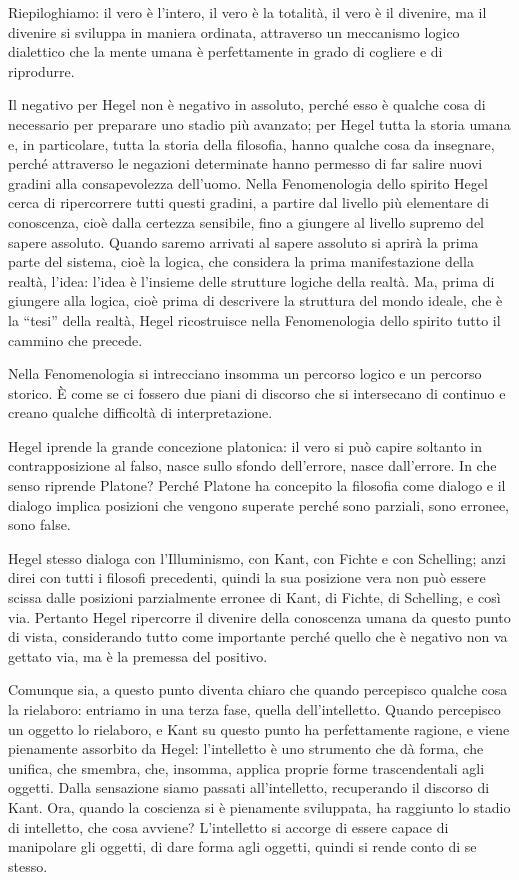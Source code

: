 \documentclass[a4paper,12pt,oneside,openany]{book}%
\begin{document}
Riepiloghiamo: il vero è l’intero, il vero è la totalità, il vero è il divenire, ma il divenire si sviluppa in maniera ordinata, attraverso un meccanismo logico dialettico che la mente umana è perfettamente in grado di cogliere e di riprodurre. 	
	
Il negativo per Hegel non è negativo in assoluto, perché esso è qualche cosa di necessario per preparare uno stadio più avanzato; per Hegel tutta la storia umana e, in particolare, tutta la storia della filosofia, hanno qualche cosa da insegnare, perché attraverso le negazioni determinate hanno permesso di far salire nuovi gradini alla consapevolezza dell’uomo. Nella Fenomenologia dello spirito Hegel cerca di ripercorrere tutti questi gradini, a partire dal livello più elementare di conoscenza, cioè dalla certezza sensibile, fino a giungere al livello supremo del sapere assoluto. Quando saremo arrivati al sapere assoluto si aprirà la prima parte del sistema, cioè la logica, che considera la prima manifestazione della realtà, l’idea: l’idea è l’insieme delle strutture logiche della realtà. Ma, prima di giungere alla logica, cioè prima di descrivere la struttura del mondo ideale, che è la “tesi” della realtà, Hegel ricostruisce nella Fenomenologia dello spirito tutto il cammino che precede.
	
Nella Fenomenologia si intrecciano insomma un percorso logico e un percorso storico. È come se ci fossero due piani di discorso che si intersecano di continuo e creano qualche difficoltà di interpretazione.

Hegel iprende la grande concezione platonica: il vero si può capire soltanto in contrapposizione al falso, nasce sullo sfondo dell’errore, nasce dall’errore. In che senso riprende Platone? Perché Platone ha concepito la filosofia come dialogo e il dialogo implica posizioni che vengono superate perché sono parziali, sono erronee, sono false.

Hegel stesso dialoga con l’Illuminismo, con Kant, con Fichte e con Schelling; anzi direi con tutti i filosofi precedenti, quindi la sua posizione vera non può essere scissa dalle posizioni parzialmente erronee di Kant, di Fichte, di Schelling, e così via. Pertanto Hegel ripercorre il divenire della conoscenza umana da questo punto di vista, considerando tutto come importante perché quello che è negativo non va gettato via, ma è la premessa del positivo.	
	
Comunque sia, a questo punto diventa chiaro che quando percepisco qualche cosa la rielaboro: entriamo in una terza fase, quella dell’intelletto. Quando percepisco un oggetto lo rielaboro, e Kant su questo punto ha perfettamente ragione, e viene pienamente assorbito da Hegel: l’intelletto è uno strumento che dà forma, che unifica, che smembra, che, insomma, applica proprie forme trascendentali agli oggetti. Dalla sensazione siamo passati all’intelletto, recuperando il discorso di Kant. Ora, quando la coscienza si è pienamente sviluppata, ha raggiunto lo stadio di intelletto, che cosa avviene? L’intelletto si accorge di essere capace di manipolare gli oggetti, di dare forma agli oggetti, quindi si rende conto di se stesso.
\end{document}
